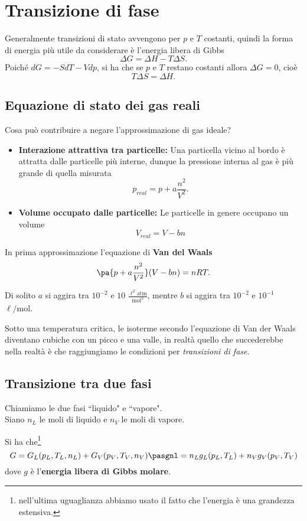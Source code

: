 \chapter{Transizione di fase}
Generalmente transizioni di stato avvengono per $p$ e $T$ costanti, quindi la forma di energia pi\`u utile da considerare \`e l'energia libera di Gibbs
\[\Delta G=\Delta H-T\Delta S.\]
Poich\'e $dG=-SdT-Vdp$, si ha che se $p$ e $T$ restano costanti allora $\Delta G=0$, cio\`e \[T\Delta S=\Delta H.\]

\section{Equazione di stato dei gas reali}
Cosa pu\`o contribuire a negare l'approssimazione di gas ideale?
\begin{itemize}
\item \textbf{Interazione attrattiva tra particelle:} Una particella vicino al bordo \`e attratta dalle particelle pi\`u interne, dunque la pressione interna al gas \`e pi\`u grande di quella misurata 
\[p_{real}=p+a\frac {n^2}{V^2}.\]
\item \textbf{Volume occupato dalle particelle:} Le particelle in genere occupano un volume
\[V_{real}=V-bn\]
\end{itemize}
\begin{fact}
In prima approssimazione l'equazione di \textbf{Van del Waals}
\[\pa{p+a \frac{n^2}{V^2}}(V-bn)=nRT.\]
\end{fact}
\begin{remark}
Di solito $a$ si aggira tra $10^{-2}$ e $10$ $\displaystyle\frac{\ell^2\mathrm{atm}}{\mathrm{mol}^2}$, mentre $b$ si aggira tra $10^{-2}$ e $10^{-1}$ $\ell/\mathrm{mol}$.
\end{remark}

\noindent
Sotto una temperatura critica, le isoterme secondo l'equazione di Van der Waals diventano cubiche con un picco e una valle, in realt\`a quello che succederebbe nella realt\`a \`e che raggiungiamo le condizioni per \textit{transizioni di fase}.


\section{Transizione tra due fasi}
Chiamiamo le due fasi ``liquido" e ``vapore".\\
Siano $n_L$ le moli di liquido e $n_V$ le moli di vapore.
\begin{remark}
Si ha che\footnote{nell'ultima uguaglianza abbiamo usato il fatto che l'energia \`e una grandezza estensiva.}
\[G=G_L(p_L,T_L,n_L)+G_V(p_V,T_V,n_V)\pasgnl={}n_Lg_L(p_L,T_L)+n_Vg_V(p_V,T_V)\]
dove $g$ \`e l'\textbf{energia libera di Gibbs molare}.
\end{remark}

